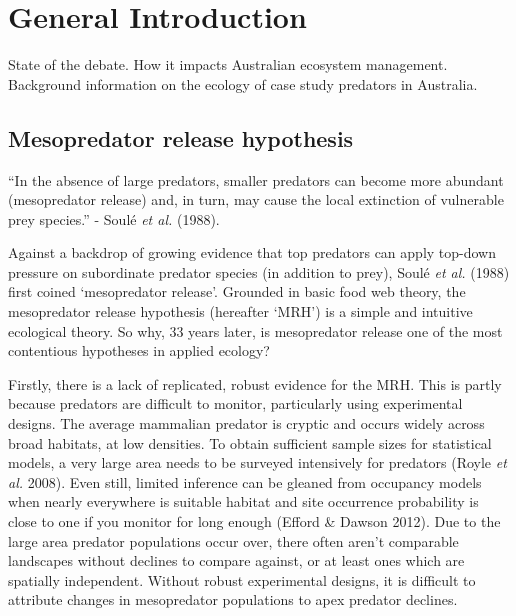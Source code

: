 \documentclass[11pt,a4paper,titlepage,twoside,openright]{style/unimelbthesis}
\begin{document}
\begin{mainmatter}

\hypertarget{general-introduction}{%
\chapter{General Introduction}\label{general-introduction}}

State of the debate. How it impacts Australian ecosystem management.
Background information on the ecology of case study predators in Australia.

\hypertarget{mesopredator-release-hypothesis}{%
\section{Mesopredator release hypothesis}\label{mesopredator-release-hypothesis}}

``In the absence of large predators, smaller predators can become more abundant (mesopredator release) and, in turn, may cause the local extinction of vulnerable prey species.'' - Soulé \emph{et al.} (1988).

Against a backdrop of growing evidence that top predators can apply top-down pressure on subordinate predator species (in addition to prey), Soulé \emph{et al.} (1988) first coined `mesopredator release'. Grounded in basic food web theory, the mesopredator release hypothesis (hereafter `MRH') is a simple and intuitive ecological theory. So why, 33 years later, is mesopredator release one of the most contentious hypotheses in applied ecology?

Firstly, there is a lack of replicated, robust evidence for the MRH. This is partly because predators are difficult to monitor, particularly using experimental designs. The average mammalian predator is cryptic and occurs widely across broad habitats, at low densities. To obtain sufficient sample sizes for statistical models, a very large area needs to be surveyed intensively for predators (Royle \emph{et al.} 2008). Even still, limited inference can be gleaned from occupancy models when nearly everywhere is suitable habitat and site occurrence probability is close to one if you monitor for long enough (Efford \& Dawson 2012). Due to the large area predator populations occur over, there often aren't comparable landscapes without declines to compare against, or at least ones which are spatially independent. Without robust experimental designs, it is difficult to attribute changes in mesopredator populations to apex predator declines.


\end{mainmatter}
\end{document}
